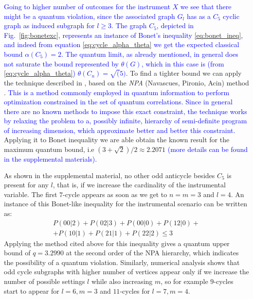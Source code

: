 \documentclass[letterpaper]{article}
\begin{document}
\textcolor{blue}{
Going to higher number of outcomes for the instrument $X$ we see that
there might be a quantum violation, since the associated graph $G_l$
has as a $C_5$ cyclic graph as induced subgraph for $l \ge 3$.
The graph $C_5$, depicted in Fig.~\ref{fig:bonetexc},
represents an instance of Bonet's inequality \eqref{eq:bonet_ineq}, and indeed from
equation \eqref{eq:cycle_alpha_theta} we get the expected classical
bound $\alpha(C_5)=2$.
The quantum limit, as already mentioned, in general does not saturate the
bound represented by $\theta(G)$, which in this case is (from \eqref{eq:cycle_alpha_theta})
$\theta(C_n) = \sqrt(5)$.
}
To find a tighter bound we can apply the technique described in
\cite{rabelo2014}, based on the \emph{NPA} (Navascues, Pironio, Acin) method \cite{npa2008}.
\textcolor{blue}{
This is a method commonly employed in quantum information to perform optimization constrained in the set of quantum correlations. Since in general there are no known methods to impose this exact constraint, the technique works by relaxing the problem to a, possibly infinite, hierarchy of semi-definite program of increasing dimension, which approximate better and better this constraint.
}
Applying it to Bonet inequality we are able obtain the known result for the
maximum quantum bound, i.e $(3+\sqrt{2})/2 \approx 2.2071$ \textcolor{blue}{(more
details can be found in the supplemental materials)}.

As shown in the supplemental material, no other odd anticycle besides
$C_5$ is present for any $l$, that is, if we increase the cardinality of the
instrumental variable. The first $7$-cycle appears as soon as we get to $n=m=3$ and $l=4$. 
An instance of this Bonet-like inequality for the instrumental scenario can be written as:
\begin{multline}
    P(00|2) + P(02|3) + P(00|0) + P(12|0) + \\
    + P(10|1) + P(21|1) + P(22|2) \le 3 
    \label{eq:c7_instrumental433}
\end{multline}
Applying the method cited above for this inequality gives a quantum upper bound
of $q = 3.2990$ at the second order of the NPA hierarchy, which indicates the
possibility of a quantum violation.
Similarly, numerical analysis shows that odd cycle subgraphs with higher number
of vertices appear only if we increase the number of possible settings $l$ while
also increasing $m$, so for example $9$-cycles start to appear for $l=6, m=3$ 
and $11$-cycles for $l=7, m=4$.
\end{document}
